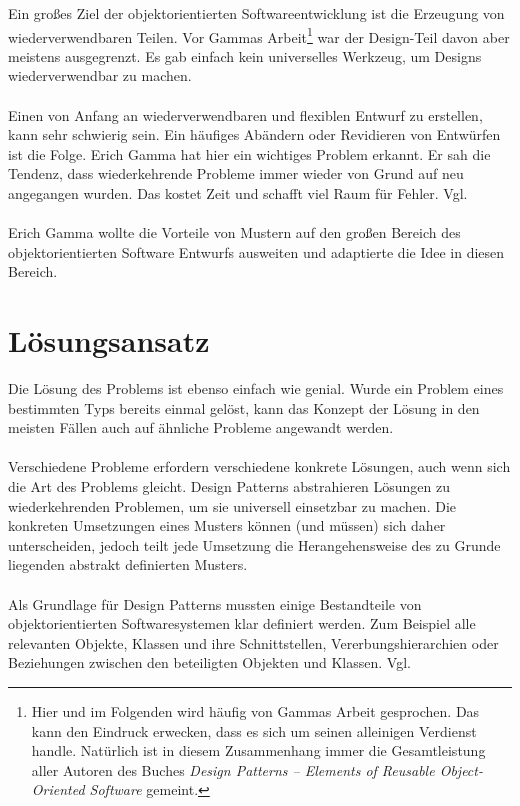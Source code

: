 \documentclass[fontsize=11pt,a4paper,final]{scrreprt}[2003/01/01]
\begin{document}
Ein großes Ziel der objektorientierten Softwareentwicklung ist die Erzeugung von wiederverwendbaren Teilen. Vor Gammas Arbeit\footnote{Hier und im Folgenden wird häufig von \glqq Gammas Arbeit\grqq{} gesprochen. Das kann den Eindruck erwecken, dass es sich um seinen alleinigen Verdienst handle. Natürlich ist in diesem Zusammenhang immer die Gesamtleistung aller Autoren des Buches \textit{Design Patterns – Elements of Reusable Object-Oriented Software} \cite{gamma2004} gemeint.} war der Design-Teil davon aber meistens ausgegrenzt. Es gab einfach kein universelles Werkzeug, um Designs wiederverwendbar zu machen.
\\ \\
Einen von Anfang an wiederverwendbaren und flexiblen Entwurf zu erstellen, kann sehr schwierig sein. Ein häufiges Abändern oder Revidieren von Entwürfen ist die Folge. Erich Gamma hat hier ein wichtiges Problem erkannt. Er sah die Tendenz, dass wiederkehrende Probleme immer wieder von Grund auf neu angegangen wurden. Das kostet Zeit und schafft viel Raum für Fehler. Vgl. \cite[S. 1]{gamma2004}
\\ \\
Erich Gamma wollte die Vorteile von Mustern auf den großen Bereich des objektorientierten Software Entwurfs ausweiten und adaptierte die Idee in diesen Bereich.

\section{Lösungsansatz}\label{se:Lösungsansatz}

Die Lösung des Problems ist ebenso einfach wie genial. Wurde ein Problem eines bestimmten Typs bereits einmal gelöst, kann das Konzept der Lösung in den meisten Fällen auch auf ähnliche Probleme angewandt werden.
\\ \\
Verschiedene Probleme erfordern verschiedene konkrete Lösungen, auch wenn sich die Art des Problems gleicht. Design Patterns abstrahieren Lösungen zu wiederkehrenden Problemen, um sie universell einsetzbar zu machen. Die konkreten Umsetzungen eines Musters können (und müssen) sich daher unterscheiden, jedoch teilt jede Umsetzung die Herangehensweise des zu Grunde liegenden abstrakt definierten Musters.
\\ \\
Als Grundlage für Design Patterns mussten einige Bestandteile von objektorientierten Softwaresystemen klar definiert werden. Zum Beispiel alle relevanten Objekte, Klassen und ihre Schnittstellen, Vererbungshierarchien oder Beziehungen zwischen den beteiligten Objekten und Klassen. Vgl. \cite[S. 1]{gamma2004}
\end{document}
